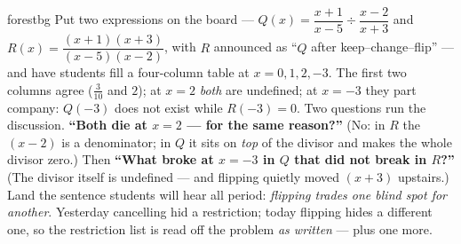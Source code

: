 \documentclass[10pt]{article}
\begin{document}
\begin{skillbox}[Hook]{forestbg}
    Put two expressions on the board --- $Q(x)=\dfrac{x+1}{x-5}\div\dfrac{x-2}{x+3}$ and
    $R(x)=\dfrac{(x+1)(x+3)}{(x-5)(x-2)}$, with $R$ announced as ``$Q$ after keep--change--flip'' --- and
    have students fill a four-column table at $x=0,1,2,-3$. The first two columns agree
    ($\tfrac{3}{10}$ and $2$); at $x=2$ \emph{both} are undefined; at $x=-3$ they part company:
    $Q(-3)$ does not exist while $R(-3)=0$. Two questions run the discussion.
    \textbf{``Both die at $x=2$ --- for the same reason?''} (No: in $R$ the $(x-2)$ is a denominator; in
    $Q$ it sits on \emph{top} of the divisor and makes the whole divisor zero.) Then
    \textbf{``What broke at $x=-3$ in $Q$ that did not break in $R$?''} (The divisor itself is
    undefined --- and flipping quietly moved $(x+3)$ upstairs.) Land the sentence students will hear all
    period: \emph{flipping trades one blind spot for another}. Yesterday cancelling hid a restriction;
    today flipping hides a different one, so the restriction list is read off the problem \emph{as
    written} --- plus one more.
\end{skillbox}
\end{document}
